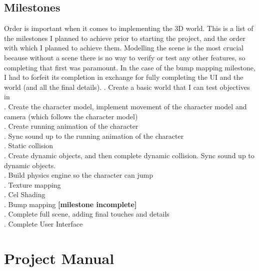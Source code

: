 \documentclass {article}
\begin{document}
\subsection{Milestones}
Order is important when it comes to implementing the 3D world. This is a list of the milestones I planned to achieve prior to starting the project, and the order with which I planned to achieve them. Modelling the scene is the most crucial because without a scene there is no way to verify or test any other features, so completing that first was paramount. In the case of the bump mapping milestone, I had to forfeit its completion in exchange for fully completing the UI and the world (and all the final details). 
\newline
\newline
{}. Create a basic world that I can test objectives in\\
. Create the character model, implement movement of the character model and \newline
\indent \indent camera (which follows the character model) \\
. Create running animation of the character \\
. Sync sound up to the running animation of the character \\
. Static collision \\
. Create dynamic objects, and then complete dynamic collision. Sync sound up to dynamic objects. \\
. Build physics engine so the character can jump \\
. Texture mapping \\
. Cel Shading \\ 
. Bump mapping \textbf{[milestone incomplete]} \\ 
. Complete full scene, adding final touches and details \\
. Complete User Interface \\

\pagebreak

\section{Project Manual}
\end{document}
